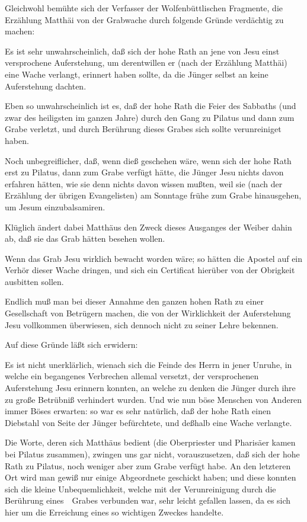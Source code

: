 \begin{aufza}
\begin{RWanm}
Gleichwohl bemühte sich der Verfasser der Wolfenbüttlischen Fragmente, die Erzählung Matthäi von der Grabwache durch folgende Gründe verdächtig zu machen:~
\begin{aufzb}
\item Es ist sehr unwahrscheinlich, daß sich der hohe Rath an jene von Jesu einst versprochene Auferstehung, um derentwillen er (nach der Erzählung Matthäi) eine Wache verlangt, erinnert haben sollte, da die Jünger selbst an keine Auferstehung dachten.
\item Eben so unwahrscheinlich ist es, daß der hohe Rath die Feier des Sabbaths (und zwar des heiligsten im ganzen Jahre) durch den Gang zu Pilatus und dann zum Grabe verletzt, und durch Berührung dieses Grabes sich sollte verunreiniget haben.
\item Noch unbegreiflicher, daß, wenn dieß geschehen wäre, wenn sich der hohe Rath  erst zu Pilatus, dann zum Grabe verfügt hätte, die Jünger Jesu nichts davon erfahren hätten, wie sie denn nichts davon wissen mußten, weil sie (nach der Erzählung der übrigen Evangelisten) am Sonntage frühe zum Grabe hinausgehen, um Jesum einzubalsamiren.
\item Klüglich ändert dabei Matthäus den Zweck dieses Ausganges der Weiber dahin ab, daß sie das Grab hätten besehen wollen.
\item Wenn das Grab Jesu wirklich bewacht worden wäre; so hätten die Apostel auf ein Verhör dieser Wache dringen, und sich ein Certificat hierüber von der Obrigkeit ausbitten sollen.
\item Endlich muß man bei dieser Annahme den ganzen hohen Rath zu einer Gesellschaft von Betrügern machen, die von der Wirklichkeit der Auferstehung Jesu vollkommen überwiesen, sich dennoch nicht zu seiner Lehre bekennen.
\end{aufzb}
Auf diese Gründe läßt sich erwidern:
\begin{aufzb}
\item Es ist nicht unerklärlich, wienach sich die Feinde des Herrn in jener Unruhe, in welche ein begangenes Verbrechen allemal versetzt, der versprochenen Auferstehung Jesu erinnern konnten, an welche zu denken die Jünger durch ihre zu große Betrübniß verhindert wurden. Und wie nun böse Menschen von Anderen immer Böses erwarten: so war es sehr natürlich, daß der hohe Rath einen Diebstahl von Seite der Jünger befürchtete, und deßhalb eine Wache verlangte.
\item Die Worte, deren sich Matthäus bedient (die Oberpriester und Pharisäer kamen bei Pilatus zusammen), zwingen uns gar nicht, vorauszusetzen, daß sich der hohe Rath  zu Pilatus, noch weniger aber zum Grabe verfügt habe. An den letzteren Ort wird man gewiß nur einige Abgeordnete geschickt haben; und diese konnten sich die kleine Unbequemlichkeit, welche mit der Verunreinigung durch die Berührung eines~\ Grabes verbunden war, sehr leicht gefallen lassen, da es sich hier um die Erreichung eines so wichtigen Zweckes handelte.

\end{aufzb}
\end{RWanm}
\end{aufza}

